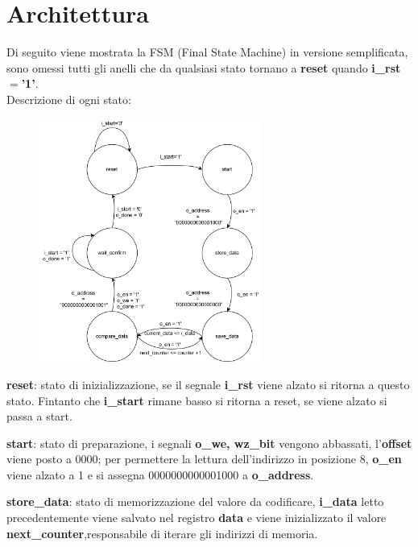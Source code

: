 \documentclass[12pt]{article}
\begin{document}
\section{Architettura}
Di seguito viene mostrata la FSM (Final State Machine) in versione semplificata, sono omessi tutti gli anelli che da qualsiasi stato tornano a \textbf{reset} quando \textbf{i\_rst\(=\)'1'}.\newline
\\Descrizione di ogni stato:
\begin{itemize}
    \parbox[t]{\dimexpr\textwidth-\leftmargin}{%
    \vspace{-2.5mm}
    \begin{figure}
        \centering
        \vspace{-\baselineskip}
        \includegraphics[width=0.65\textwidth]{FSM.png}
    \end{figure}
    \item \textbf{reset}: stato di inizializzazione, se il segnale \textbf{i\_rst} viene alzato si ritorna a questo stato. Fintanto che \textbf{i\_start} rimane basso si ritorna a reset, se viene alzato si passa a start.
    \item \textbf{start}: stato di preparazione, i segnali \textbf{o\_we, wz\_bit} vengono abbassati, l'\textbf{offset} viene posto a 0000; per permettere la lettura dell'indirizzo in posizione 8, \textbf{o\_en} viene alzato a 1 e si assegna 0000000000001000 a \textbf{o\_address}.
    \item \textbf{store\_data}: stato di memorizzazione del valore da codificare, \textbf{i\_data} letto precedentemente viene salvato nel registro \textbf{data} e viene inizializzato il valore \textbf{next\_counter},responsabile di iterare gli indirizzi di memoria.
}
\end{itemize}
\end{document}
